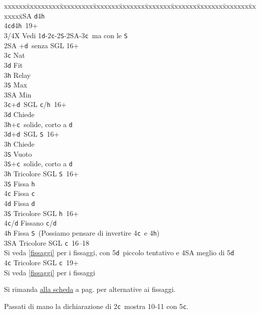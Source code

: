 \documentclass[a4paper,italian]{article}
\newcommand{\BS}{\small{\texttt{S}}}
\newcommand{\BC}{\small{\texttt{c}}}
\newcommand{\BD}{\small{\texttt{d}}}
\newcommand{\BH}{\small{\texttt{h}}}
\newenvironment{bidtable}
{\begin{tabbing}

    xxxxxx\=xxxxxxxxx\=xxxxxxxxx\=xxxxxxx\=xxxxxxx\=xxxxxxx\=xxxxxxx\=xxxxxxx\=xxxxxxx\=xxxxxxx\=\kill}
{\end{tabbing} }%
\begin{document}
\begin{bidtable}
    3\small{SA} \BD 4\BH \\
    4\BC {}\BD 4\BH\ 19+\-\-\\
    3/4X \> Vedi 1\BD -2\BC -2\BS -2\small{SA}-3\BC\ ma con le \BS \-\-\\
    2\small{SA} +\BD\ senza SGL 16+\+\\
    3\BC \> Nat\\
    3\BD \> Fit\\
    3\BH \> Relay\+\\
    3\BS \> Max\\
    3\small{SA} \> Min\-\-\\
    3\BC {}+\BD\ SGL \BC /\BH\ 16+\+\\
    3\BD \> Chiede\\
    3\BH {}+\BC\ solide, corto a \BD \-\\
    3\BD {}+\BD\ SGL \BS\ 16+\+\\
    3\BH \> Chiede\+\\
    3\BS \> Vuoto\-\\
    3\BS {}+\BC\ solide, corto a \BD \-\\
    3\BH \> Tricolore SGL \BS\ 16+\+\\
    3\BS \> Fissa \BH \\
    4\BC \> Fissa \BC \\
    4\BD \> Fissa \BD \-\\
    3\BS \> Tricolore SGL \BH\ 16+\+\\
    4\BC/\BD \> Fissano \BC /\BD \\
    4\BH \> Fissa \BS\ (Possiamo pensare di invertire 4\BC\ e 4\BH )\-\\
    3\small{SA} \> Tricolore SGL \BC\ 16--18\+\\
    Si veda \ref{fissaggi} per i fissaggi, con 5\BD\ piccolo tentativo e 4\small{SA} meglio di 5\BD\-\\
    4\BC \> Tricolore SGL \BC\ 19+\+\\
    Si veda \ref{fissaggi} per i fissaggi\-\-
\end{bidtable}
\bigbreak
Si rimanda \hyperref[fissaggi]{alla scheda} a pag. \pageref{fissaggi} per alternative ai fissaggi.

Passati di mano la dichiarazione di 2\BC\ mostra 10-11 con 5\BC .
\end{document}
